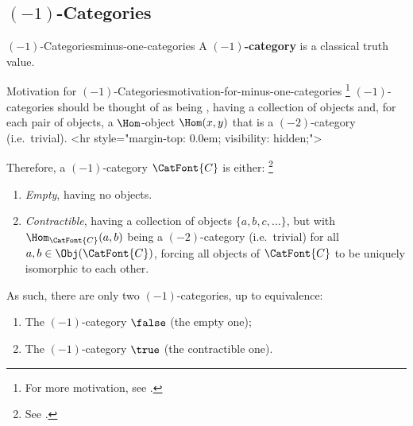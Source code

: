 \subsection{\texorpdfstring{$(-1)$}{(-1)}-Categories}\label{subsection-minus-one-categories}
\begin{definition}{$(-1)$-Categories}{minus-one-categories}%
    A \textbf{$(-1)$-category} is a classical truth value.%
\end{definition}
\begin{remark}{Motivation for $(-1)$-Categories}{motivation-for-minus-one-categories}%
    \footnote{%
        For more motivation, see \cite[p.~13]{lectures-on-n-categories-and-cohomology}.
    }%
    $(-1)$-categories should be thought of as being , having a collection of objects and, for each pair of objects, a $\Hom$-object $\Hom(x,y)$ that is a $(-2)$-category (i.e.\ trivial).
    <hr style="margin-top: 0.0em; visibility: hidden;">

    \vspace{0.5\baselineskip}
    Therefore, a $(-1)$-category $\CatFont{C}$ is either:%
    \footnote{%
        See \cite[pp.~33--34]{lectures-on-n-categories-and-cohomology}.
        \par\vspace*{\TCBBoxCorrection}
    }%
    \begin{enumerate}
        \item\label{motivation-for-minus-one-categories-empty}\emph{Empty}, having no objects.
        \item\label{motivation-for-minus-one-categories-contractible}\emph{Contractible}, having a collection of objects $\{a,b,c,\ldots\}$, but with $\Hom_{\CatFont{C}}(a,b)$ being a $(-2)$-category (i.e.\ trivial) for all $a,b\in\Obj(\CatFont{C})$, forcing all objects of $\CatFont{C}$ to be uniquely isomorphic to each other.
    \end{enumerate}
    As such, there are only two $(-1)$-categories, up to equivalence:
    \begin{enumerate}
        \item\label{motivation-for-minus-one-categories-false}The $(-1)$-category $\false$ (the empty one);
        \item\label{motivation-for-minus-one-categories-true}The $(-1)$-category $\true$  (the contractible one).%
    \end{enumerate}
\end{remark}
